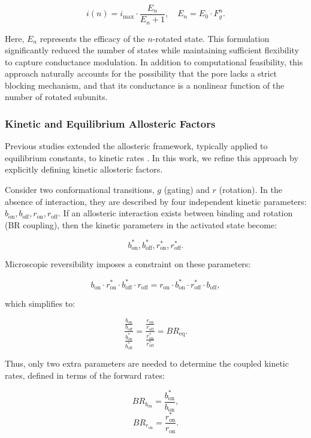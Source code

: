 \documentclass[pdflatex,sn-nature]{sn-jnl}%
\theoremstyle{thmstyleone}%
\theoremstyle{thmstyletwo}%
\theoremstyle{thmstylethree}%
\begin{document}
\[
i(n) = i_{\text{max}} \cdot \frac{E_n}{E_n + 1}, \quad E_n = E_0 \cdot F_g^n.
\]

Here, \( E_n \) represents the efficacy of the \( n \)-rotated state. This formulation significantly reduced the number of states while maintaining sufficient flexibility to capture conductance modulation. In addition to computational feasibility, this approach naturally accounts for the possibility that the pore lacks a strict blocking mechanism, and that its conductance is a nonlinear function of the number of rotated subunits.

\subsubsection{Kinetic and Equilibrium Allosteric Factors}

Previous studies extended the allosteric framework, typically applied to equilibrium constants, to kinetic rates \cite{Moffatt_hume}. In this work, we refine this approach by explicitly defining kinetic allosteric factors.

Consider two conformational transitions, \( g \) (gating) and \( r \) (rotation). In the absence of interaction, they are described by four independent kinetic parameters: \( b_{\text{on}}, b_{\text{off}}, r_{\text{on}}, r_{\text{off}} \). If an allosteric interaction exists between binding and rotation (BR coupling), then the kinetic parameters in the activated state become:

\[
b^*_{\text{on}}, b^*_{\text{off}}, r^*_{\text{on}}, r^*_{\text{off}}.
\]

Microscopic reversibility imposes a constraint on these parameters:

\[
b_{\text{on}} \cdot r^*_{\text{on}} \cdot b^*_{\text{off}} \cdot r_{\text{off}} = r_{\text{on}} \cdot b^*_{\text{on}} \cdot r^*_{\text{off}} \cdot b_{\text{off}},
\]

which simplifies to:

\[
\frac {\frac {b_{\text{on}}}{b_{\text{off}}}}{\frac {b^*_{\text{on}}} {b^*_{\text{off}}}} = \frac {\frac {r_{\text{on}}}{r_{\text{off}}}}{\frac {r^*_{\text{on}}} {r^*_{\text{off}}}} = BR_{\text{eq}}.
\]

Thus, only two extra parameters are needed to determine the coupled kinetic rates, defined in terms of the forward rates:

\[
BR_{b_{\text{on}}} = \frac{b^*_{\text{on}}}{b_{\text{on}}},
\]
\[
BR_{r_{\text{on}}} = \frac{r^*_{\text{on}}}{r_{\text{on}}}.
\]
\end{document}
